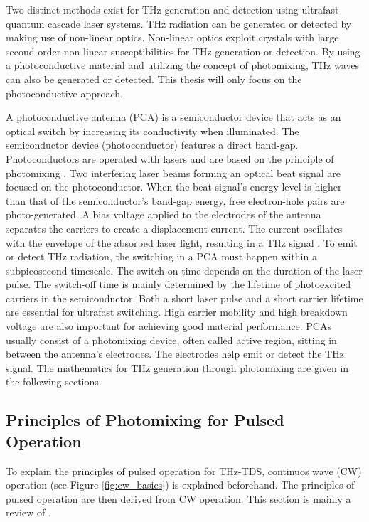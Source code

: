 Two distinct methods exist for THz generation and detection using ultrafast quantum cascade laser systems. THz radiation can be generated or detected by making use of non-linear optics. Non-linear optics exploit crystals with large second-order non-linear susceptibilities \cite{THzSourcesDetectors, kimHighlyNonlinearOptical2021} for THz generation or detection. By using a photoconductive material and utilizing the concept of photomixing, THz waves can also be generated or detected. This thesis will only focus on the photoconductive approach. 

A photoconductive antenna (PCA) is a semiconductor device that acts as an optical switch by increasing its conductivity when illuminated. The semiconductor device (photoconductor) features a direct band-gap. Photoconductors are operated with lasers and are based on the principle of photomixing \cite{peytavitTHzPhotomixers2021}. Two interfering laser beams forming an optical beat signal are focused on the photoconductor. When the beat signal's energy level is higher than that of the semiconductor's band-gap energy, free electron-hole pairs are photo-generated. A bias voltage applied to the electrodes of the antenna separates the carriers to create a displacement current. The current oscillates with the envelope of the absorbed laser light, resulting in a THz signal \cite{nandiErAsInAlGaAsPhotoconductors2021}. To emit or detect THz radiation, the switching in a PCA must happen within a subpicosecond timescale. The switch-on time depends on the duration of the laser pulse. The switch-off time is mainly determined by the lifetime of photoexcited carriers in the semiconductor. Both a short laser pulse and a short carrier lifetime are essential for ultrafast switching. High carrier mobility and high breakdown voltage are also important for achieving good material performance. PCAs usually consist of a photomixing device, often called active region, sitting in between the antenna's electrodes. The electrodes help emit or detect the THz signal. The mathematics for THz generation through photomixing are given in the following sections. 

\subsection{Principles of Photomixing for Pulsed Operation}
To explain the principles of pulsed operation for THz-TDS, continuos wave (CW) operation (see Figure \ref{fig:cw_basics}) is explained beforehand. The principles of pulsed operation are then derived from CW operation. This section is mainly a review of \cite{nandiErAsInAlGaAsPhotoconductors2021,faridiPulsedFreeSpace2023,preuPrinciplesTHzGeneration2015}.

